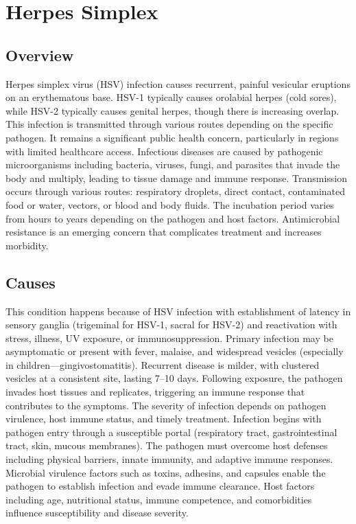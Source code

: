 \chapter{Herpes Simplex}
\label{sec:Herpes Simplex}

\section{Overview}
Herpes simplex virus (HSV) infection causes recurrent, painful vesicular eruptions on an erythematous base. HSV-1 typically causes orolabial herpes (cold sores), while HSV-2 typically causes genital herpes, though there is increasing overlap. This infection is transmitted through various routes depending on the specific pathogen. It remains a significant public health concern, particularly in regions with limited healthcare access. Infectious diseases are caused by pathogenic microorganisms including bacteria, viruses, fungi, and parasites that invade the body and multiply, leading to tissue damage and immune response. Transmission occurs through various routes: respiratory droplets, direct contact, contaminated food or water, vectors, or blood and body fluids. The incubation period varies from hours to years depending on the pathogen and host factors. Antimicrobial resistance is an emerging concern that complicates treatment and increases morbidity.
\section{Causes}
This condition happens because of HSV infection with establishment of latency in sensory ganglia (trigeminal for HSV-1, sacral for HSV-2) and reactivation with stress, illness, UV exposure, or immunosuppression. Primary infection may be asymptomatic or present with fever, malaise, and widespread vesicles (especially in children---gingivostomatitis). Recurrent disease is milder, with clustered vesicles at a consistent site, lasting 7--10 days. Following exposure, the pathogen invades host tissues and replicates, triggering an immune response that contributes to the symptoms. The severity of infection depends on pathogen virulence, host immune status, and timely treatment. Infection begins with pathogen entry through a susceptible portal (respiratory tract, gastrointestinal tract, skin, mucous membranes). The pathogen must overcome host defenses including physical barriers, innate immunity, and adaptive immune responses. Microbial virulence factors such as toxins, adhesins, and capsules enable the pathogen to establish infection and evade immune clearance. Host factors including age, nutritional status, immune competence, and comorbidities influence susceptibility and disease severity.

